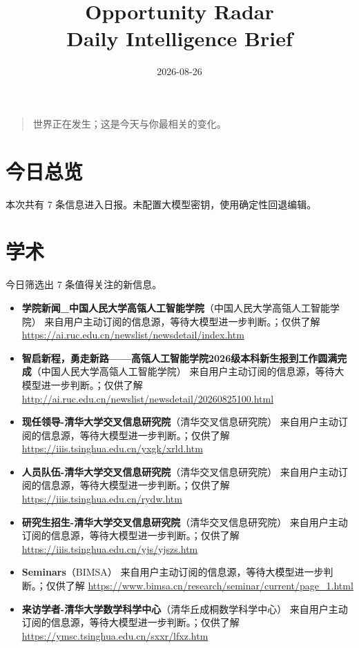 \documentclass[11pt]{ctexart}
\title{Opportunity Radar\\Daily Intelligence Brief}
\date{2026-08-26}
\begin{document}
\maketitle
\begin{quote}\Large 世界正在发生；这是今天与你最相关的变化。\end{quote}
\section*{今日总览}
本次共有 7 条信息进入日报。未配置大模型密钥，使用确定性回退编辑。
\section*{学术}
今日筛选出 7 条值得关注的新信息。
\begin{itemize}
\item \textbf{学院新闻\_中国人民大学高瓴人工智能学院}（中国人民大学高瓴人工智能学院） 来自用户主动订阅的信息源，等待大模型进一步判断。；仅供了解 \url{https://ai.ruc.edu.cn/newslist/newsdetail/index.htm}
\item \textbf{智启新程，勇走新路——高瓴人工智能学院2026级本科新生报到工作圆满完成}（中国人民大学高瓴人工智能学院） 来自用户主动订阅的信息源，等待大模型进一步判断。；仅供了解 \url{http://ai.ruc.edu.cn/newslist/newsdetail/20260825100.html}
\item \textbf{现任领导-清华大学交叉信息研究院}（清华交叉信息研究院） 来自用户主动订阅的信息源，等待大模型进一步判断。；仅供了解 \url{https://iiis.tsinghua.edu.cn/yxgk/xrld.htm}
\item \textbf{人员队伍-清华大学交叉信息研究院}（清华交叉信息研究院） 来自用户主动订阅的信息源，等待大模型进一步判断。；仅供了解 \url{https://iiis.tsinghua.edu.cn/rydw.htm}
\item \textbf{研究生招生-清华大学交叉信息研究院}（清华交叉信息研究院） 来自用户主动订阅的信息源，等待大模型进一步判断。；仅供了解 \url{https://iiis.tsinghua.edu.cn/yjs/yjszs.htm}
\item \textbf{Seminars}（BIMSA） 来自用户主动订阅的信息源，等待大模型进一步判断。；仅供了解 \url{https://www.bimsa.cn/research/seminar/current/page_1.html}
\item \textbf{来访学者-清华大学数学科学中心}（清华丘成桐数学科学中心） 来自用户主动订阅的信息源，等待大模型进一步判断。；仅供了解 \url{https://ymsc.tsinghua.edu.cn/sxxr/lfxz.htm}
\end{itemize}
\end{document}
